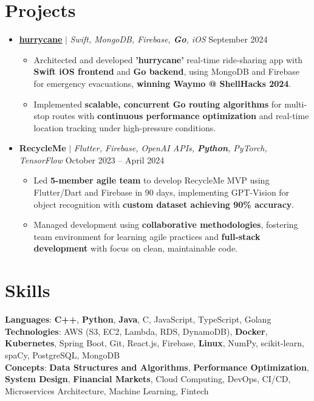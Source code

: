 \documentclass[letterpaper,11pt]{article}
\newcommand{\resumeItem}[1]{
  \item\small{
    {#1 \vspace{-2pt}}
  }
}
\newcommand{\resumeProjectHeading}[2]{
  \item
  \small#1 \hfill #2 \\
  \vspace{-7pt} %
}
\newcommand{\resumeSubHeadingListStart}{\begin{itemize}[leftmargin=0.15in, label={}]}
\newcommand{\resumeSubHeadingListEnd}{\end{itemize}}
\newcommand{\resumeItemListStart}{\begin{itemize}}
\newcommand{\resumeItemListEnd}{\end{itemize}\vspace{-5pt}}
\begin{document}
\section{Projects}
    \resumeSubHeadingListStart
    \resumeProjectHeading
          {\underline{\textbf {\href{https://github.com/keshavbabu/shellhacks/tree/main}{hurrycane}}} $|$ \emph{Swift, MongoDB, Firebase, \textbf{Go}, iOS}}{September 2024}
          \resumeItemListStart
            \resumeItem{Architected and developed \textbf{'hurrycane'} real-time ride-sharing app with \textbf{Swift iOS frontend} and \textbf{Go backend}, using MongoDB and Firebase for emergency evacuations, \textbf{winning Waymo @ ShellHacks 2024}.}
            \resumeItem{Implemented \textbf{scalable, concurrent Go routing algorithms} for multi-stop routes with \textbf{continuous performance optimization} and real-time location tracking under high-pressure conditions.}
          \resumeItemListEnd
      \resumeProjectHeading
          {\textbf{RecycleMe} $|$ \emph{Flutter, Firebase, OpenAI APIs, \textbf{Python}, PyTorch, TensorFlow}}{October 2023 -- April 2024}
          \resumeItemListStart
            \resumeItem{Led \textbf{5-member agile team} to develop RecycleMe MVP using Flutter/Dart and Firebase in 90 days, implementing GPT-Vision for object recognition with \textbf{custom dataset achieving 90\% accuracy}.}
            \resumeItem{Managed development using \textbf{collaborative methodologies}, fostering team environment for learning agile practices and \textbf{full-stack development} with focus on clean, maintainable code.}
          \resumeItemListEnd

    \resumeSubHeadingListEnd


\section{Skills}
 \begin{itemize}[leftmargin=0.15in, label={}]
    \small{\item{
     \textbf{Languages}{: \textbf{C++}, \textbf{Python}, \textbf{Java}, C, JavaScript, TypeScript, Golang} \\
     \textbf{Technologies}{: AWS (S3, EC2, Lambda, RDS, DynamoDB), \textbf{Docker}, \textbf{Kubernetes}, Spring Boot, Git, React.js, Firebase, \textbf{Linux}, NumPy, scikit-learn, spaCy, PostgreSQL, MongoDB} \\
     \textbf{Concepts}{: \textbf{Data Structures and Algorithms}, \textbf{Performance Optimization}, \textbf{System Design}, \textbf{Financial Markets}, Cloud Computing, DevOps, CI/CD, Microservices Architecture, Machine Learning, Fintech} }}
 \end{itemize}
 
%
\end{document}
